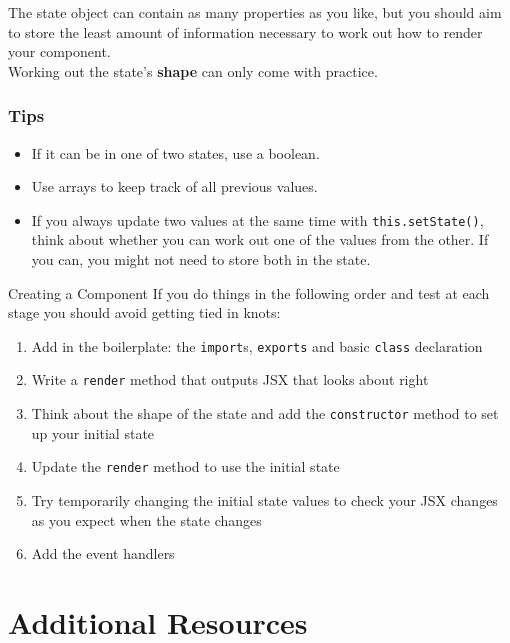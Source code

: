 The state object can contain as many properties as you like, but you should aim to store the least amount of information necessary to work out how to render your component.
\\

Working out the state's \textbf{shape} can only come with practice.

\subsubsection{Tips}

\begin{itemize}
    \item If it can be in one of two states, use a boolean.
    \item Use arrays to keep track of all previous values.
    \item If you always update two values at the same time with \texttt{this.setState()}, think about whether you can work out one of the values from the other. If you can, you might not need to store both in the state.
\end{itemize}


\pagebreak


\begin{infobox}{Creating a Component}
    If you do things in the following order and test at each stage you should avoid getting tied in knots:

    \begin{enumerate}
        \item Add in the boilerplate: the \texttt{import}s, \texttt{exports} and basic \texttt{class} declaration
        \item Write a \texttt{render} method that outputs JSX that looks about right
        \item Think about the shape of the state and add the \texttt{constructor} method to set up your initial state
        \item Update the \texttt{render} method to use the initial state
        \item Try temporarily changing the initial state values to check your JSX changes as you expect when the state changes
        \item Add the event handlers
    \end{enumerate}
\end{infobox}




\section{Additional Resources}

